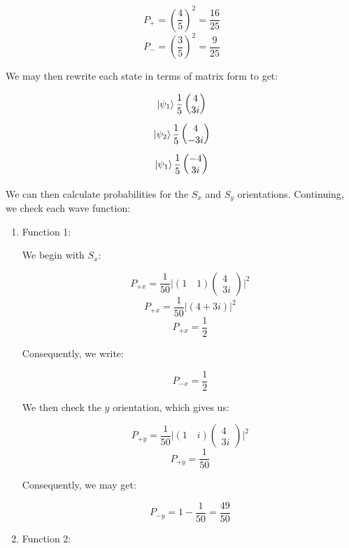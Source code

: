 \begin{enumerate}
\begin{enumerate}
        $$\boxed{P_+=\left( \frac{4}{5} \right)^2=\frac{16}{25}}$$
        $$\boxed{P_-=\left( \frac{3}{5} \right)^2=\frac{9}{25}}$$

        We may then rewrite each state in terms of matrix form to get:

        $$\ket{\psi_1}\frac{1}{5}\left( \begin{matrix} 4\\3i \end{matrix} \right)$$
        $$\ket{\psi_2}\frac{1}{5}\left( \begin{matrix} 4\\-3i \end{matrix} \right)$$
        $$\ket{\psi_1}\frac{1}{5}\left( \begin{matrix} -4\\3i \end{matrix} \right)$$

        We can then calculate probabilities for the $S_x$ and $S_y$ orientations. Continuing, we check each wave function:

        \begin{enumerate}

          \item Function 1:

            We begin with $S_x$:

            $$P_{+x}=\frac{1}{50}\Big| (1\quad1)\left( \begin{matrix} 4\\3i \end{matrix} \right)\Big|^2$$
            $$P_{+x}=\frac{1}{50}\Big| (4+3i)\Big|^2$$
            $$\boxed{P_{+x}=\frac{1}{2}}$$

            Consequently, we write:

            $$\boxed{P_{-x}=\frac{1}{2}}$$

            We then check the $y$ orientation, which gives us:

            $$P_{+y}=\frac{1}{50}\Big| (1\quad i)\left( \begin{matrix} 4\\3i \end{matrix} \right)\Big|^2$$
            $$\boxed{P_{+y}=\frac{1}{50}}$$

            Consequently, we may get:

            $$\boxed{P_{-y}=1-\frac{1}{50}=\frac{49}{50}}$$

          \item Function 2:


\end{enumerate}
\end{enumerate}
\end{enumerate}
